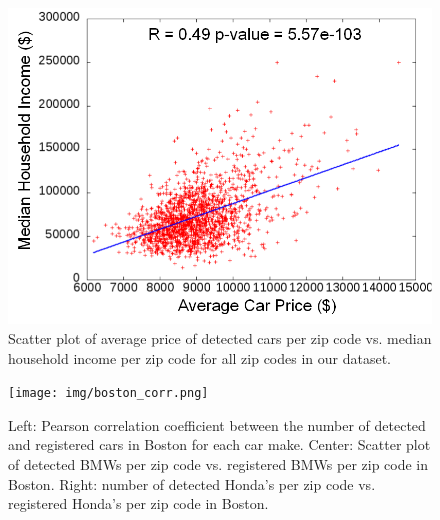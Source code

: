 \documentclass[10pt,twocolumn,letterpaper]{article}
\begin{document}
\begin{figure}[t]
\begin{center}
   \includegraphics[width=0.9\linewidth]{img/averagePriceIncome.png}
\end{center}
   \caption {Scatter plot of average price of detected cars per zip code vs. median household income per zip code for all zip codes in our dataset.}
\label{fig:price-income-corr}
\end{figure}

\begin{figure} [t]
\begin{center}
\texttt{[image: img/boston\_corr.png]}
\end{center}
\caption {Left: Pearson correlation coefficient between the number of detected and registered cars in Boston for each car make. Center: Scatter plot of detected BMWs per zip code vs. registered BMWs per zip code in Boston. Right: number of detected Honda's per zip code vs. registered Honda's per zip code in Boston.}
\label{fig:ma_corrs}
\end{figure}
 
\end{document}
